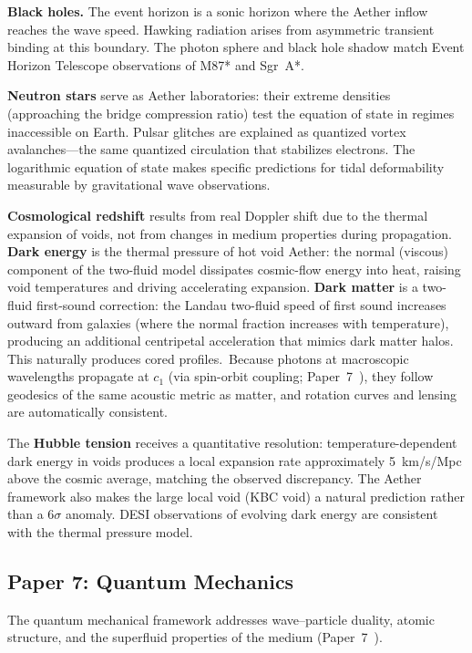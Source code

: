 \documentclass[12pt,letterpaper]{article}
\begin{document}
\textbf{Black holes.}  The event horizon is a sonic horizon where the Aether inflow
reaches the wave speed.  Hawking radiation arises from asymmetric transient binding
at this boundary.  The photon sphere and black hole shadow match Event Horizon
Telescope observations of M87* and Sgr~A*.

\textbf{Neutron stars} serve as Aether laboratories: their extreme densities
(approaching the bridge compression ratio) test the equation of state in regimes
inaccessible on Earth.  Pulsar glitches are explained as quantized vortex
avalanches---the same quantized circulation that stabilizes electrons.
The logarithmic equation of state makes specific predictions for tidal
deformability measurable by gravitational wave observations.

\textbf{Cosmological redshift} results from real Doppler shift due to the
thermal expansion of voids, not from changes in medium properties during propagation.
\textbf{Dark energy} is the thermal pressure of hot void Aether: the normal
(viscous) component of the two-fluid model dissipates cosmic-flow energy into heat,
raising void temperatures and driving accelerating expansion.
\textbf{Dark matter} is a two-fluid first-sound correction: the Landau two-fluid
speed of first sound increases outward from galaxies (where the normal fraction
increases with temperature), producing an additional centripetal acceleration that
mimics dark matter halos.  This naturally produces cored profiles.\ Because photons at macroscopic wavelengths
propagate at $c_1$ (via spin-orbit coupling; Paper~7~\cite{otto-qm}), they follow
geodesics of the same acoustic metric as matter, and rotation curves and lensing are
automatically consistent.

The \textbf{Hubble tension} receives a quantitative resolution: temperature-dependent
dark energy in voids produces a local expansion rate approximately 5~km/s/Mpc above
the cosmic average, matching the observed discrepancy.  The Aether framework also
makes the large local void (KBC void) a natural prediction rather than a $6\sigma$
anomaly.  DESI observations of evolving dark energy are consistent with the
thermal pressure model.


\subsection{Paper 7: Quantum Mechanics}

The quantum mechanical framework addresses wave--particle duality, atomic structure,
and the superfluid properties of the medium (Paper~7~\cite{otto-qm}).
\end{document}
